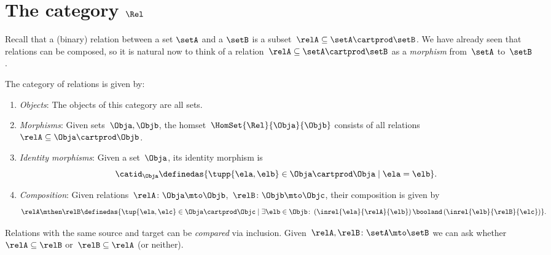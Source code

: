 
\section[The category $\Rel$]{The category $\Rel$}
\label{sec:cat-of-relations}



Recall that a (binary) relation between a set $\setA$ and a $\setB$ is a subset~$\relA \subseteq \setA \cartprod \setB$.
We have already seen that relations can be composed, so it is natural now to think of a relation~$\relA \subseteq \setA \cartprod \setB$ as a \emph{morphism} from~$\setA$ to~$\setB$.

\begin{ctdefinition}
    \label{def:Rel}
    The category of relations \iindex{\Rel}  is given by:
    \begin{enumerate}
        \item \emph{Objects}: The objects of this category are all sets.
        \item \emph{Morphisms}: Given sets~$\Obja, \Objb$, the homset~$\HomSet{\Rel}{\Obja}{\Objb}$ consists of all relations~$\relA\subseteq \Obja\cartprod \Objb$.
        \item \emph{Identity morphisms}: Given a set~$\Obja$, its identity morphism is
              \begin{equation}
                  \catid_\Obja \definedas \{ \tupp{\ela,\elb} \in \Obja \cartprod \Obja \mid  \ela = \elb \}.
              \end{equation}
        \item \emph{Composition}: Given relations~$\relA \colon \Obja\mto \Objb$,~$\relB \colon \Objb\mto \Objc$, their composition is given by
              \begin{equation}
                  \label{eq:RelCompRule}
                  \relA \mthen \relB \definedas \{\tup{\ela,\elc} \in \Obja \cartprod \Objc \mid  \exists \elb \in \Objb \colon \left(\inrel{\ela}{\relA}{\elb} \right) \booland \left(\inrel{\elb}{\relB}{\elc}\right)\}.
              \end{equation}
    \end{enumerate}
\end{ctdefinition}

\begin{remark}
    Relations with the same source and target can be \emph{compared} via inclusion.
    Given~$\relA, \relB \colon \setA\mto \setB$  we can ask whether~$\relA\subseteq \relB$ or~$\relB\subseteq \relA$ (or neither).
\end{remark}

